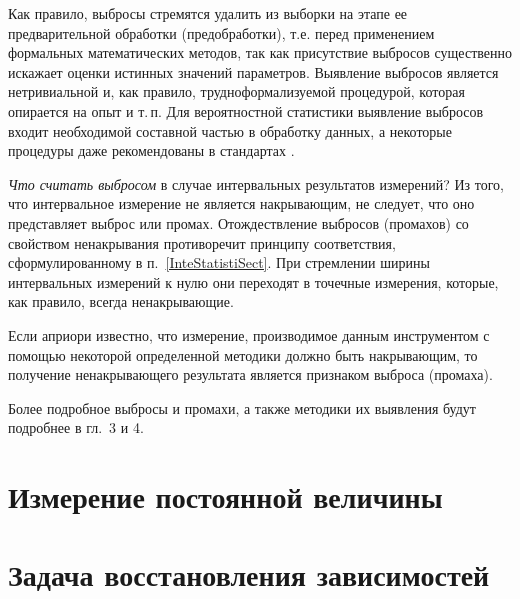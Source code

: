 \documentclass[a5paper,openany]{book}
\begin{document}
{{Как правило, выбросы стремятся удалить из выборки на этапе ее предварительной 
обработки (предобработки), т.е. перед применением  формальных 
математических методов, так как присутствие выбросов существенно искажает оценки 
истинных значений параметров. Выявление выбросов является нетривиальной и, как правило, 
трудноформализуемой процедурой, которая опирается на опыт и т.\,п. Для вероятностной 
статистики выявление выбросов входит необходимой составной частью в обработку данных, 
а некоторые процедуры даже рекомендованы в стандартах \cite{GOSTDirect}. 

\emph{Что считать выбросом} в случае интервальных результатов измерений? 
Из того, что интервальное измерение не является 
накрывающим, не следует, что оно представляет выброс или промах. 
Отождествление выбросов (промахов) со свойством ненакрывания противоречит 
принципу соответствия, сформулированному в п.~\ref{InteStatistiSect}. При стремлении ширины интервальных измерений к нулю они переходят в точечные 
измерения, которые, как правило, всегда ненакрывающие. 

Если априори известно, что измерение, производимое данным инструментом с помощью
некоторой определенной методики должно быть накрывающим, то получение 
ненакрывающего результата является признаком выброса (промаха). 
 
Более подробное выбросы и промахи, а также методики их выявления будут 
подробнее  в гл.~3 и 4.



	\chapter{Измерение постоянной величины} 
\label{MeasrConstChap}
%



	\chapter{Задача восстановления зависимостей} 
\label{FuncFitChap}





\newpage
\renewcommand{\bibname}{\centering \normalsize БИБЛИОГРАФИЧЕСКИЙ СПИСОК}  

   
	
\raggedright\small\printindex   

}}
\end{document}
